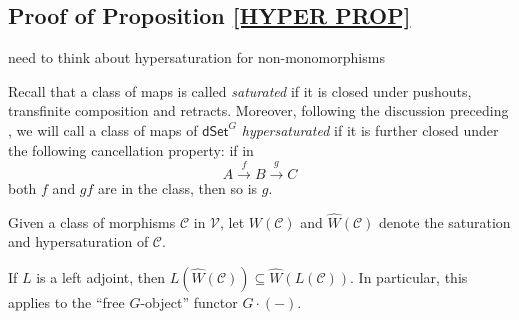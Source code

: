\documentclass[a4paper,10pt,draft]{article}%
\begin{document}
\newpage

\subsection{Proof of Proposition \ref{HYPER PROP}}


{\color{red} need to think about hypersaturation for non-monomorphisms}

Recall that a class of maps is called \textit{saturated}
if it is closed under pushouts, transfinite composition and retracts.
Moreover, following the discussion preceding \cite[Prop. 3.6.8]{HHM16}, we will call a class of maps of $\mathsf{dSet}^G$ \textit{hypersaturated} if it is further closed under the following cancellation property: if in
\[
A \xrightarrow{f} B \xrightarrow{g} C
\]
both $f$ and $gf$ are in the class, then so is $g$.

\begin{notation}
      Given a class of morphisms $\mathcal{C}$ in $\mathcal V$, let
      $W(\mathcal C)$ and $\hat{W}(\mathcal C)$ denote
      the saturation and hypersaturation of $\mathcal C$.
\end{notation}

\begin{remark}
      If $L$ is a left adjoint, then $L(\hat{W}(\mathcal C)) \subseteq \hat{W}(L(\mathcal C))$.
      In particular, this applies to the ``free $G$-object'' functor $G \cdot (-)$.
\end{remark}
\end{document}
